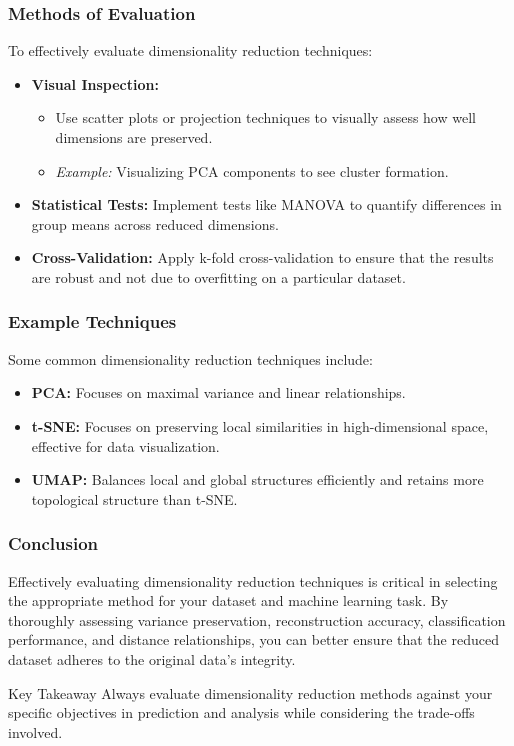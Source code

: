 \documentclass[aspectratio=169]{beamer}
\begin{document}
\begin{frame}[fragile]
    \frametitle{Methods of Evaluation}
    To effectively evaluate dimensionality reduction techniques:
    \begin{itemize}
        \item \textbf{Visual Inspection:}
            \begin{itemize}
                \item Use scatter plots or projection techniques to visually assess how well dimensions are preserved.
                \item \textit{Example:} Visualizing PCA components to see cluster formation.
            \end{itemize}
        \item \textbf{Statistical Tests:} Implement tests like MANOVA to quantify differences in group means across reduced dimensions.
        \item \textbf{Cross-Validation:} Apply k-fold cross-validation to ensure that the results are robust and not due to overfitting on a particular dataset.
    \end{itemize}
\end{frame}

\begin{frame}[fragile]
    \frametitle{Example Techniques}
    Some common dimensionality reduction techniques include:
    \begin{itemize}
        \item \textbf{PCA:} Focuses on maximal variance and linear relationships.
        \item \textbf{t-SNE:} Focuses on preserving local similarities in high-dimensional space, effective for data visualization.
        \item \textbf{UMAP:} Balances local and global structures efficiently and retains more topological structure than t-SNE.
    \end{itemize}
\end{frame}

\begin{frame}[fragile]
    \frametitle{Conclusion}
    Effectively evaluating dimensionality reduction techniques is critical in selecting the appropriate method for your dataset and machine learning task. By thoroughly assessing variance preservation, reconstruction accuracy, classification performance, and distance relationships, you can better ensure that the reduced dataset adheres to the original data's integrity.

    \begin{block}{Key Takeaway}
        Always evaluate dimensionality reduction methods against your specific objectives in prediction and analysis while considering the trade-offs involved.
    \end{block}
\end{frame}
\end{document}
